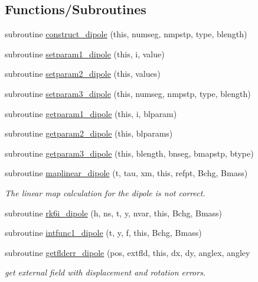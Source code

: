 \subsection*{Functions/\+Subroutines}
\begin{DoxyCompactItemize}
\item 
subroutine \mbox{\hyperlink{namespacedipoleclass_ad926e6953a9110fb9662f9d75aec0578}{construct\+\_\+dipole}} (this, numseg, nmpstp, type, blength)
\item 
subroutine \mbox{\hyperlink{namespacedipoleclass_a88c00f58bdecf1b9c087e1fa6fe4d890}{setparam1\+\_\+dipole}} (this, i, value)
\item 
subroutine \mbox{\hyperlink{namespacedipoleclass_af9b4f7bb26e407880166d1b7d19f8877}{setparam2\+\_\+dipole}} (this, values)
\item 
subroutine \mbox{\hyperlink{namespacedipoleclass_a46e12e75054e010d776e23895101e223}{setparam3\+\_\+dipole}} (this, numseg, nmpstp, type, blength)
\item 
subroutine \mbox{\hyperlink{namespacedipoleclass_af02462235721b966a71753610096e85a}{getparam1\+\_\+dipole}} (this, i, blparam)
\item 
subroutine \mbox{\hyperlink{namespacedipoleclass_af793a317f0b5d337d6818755609641a7}{getparam2\+\_\+dipole}} (this, blparams)
\item 
subroutine \mbox{\hyperlink{namespacedipoleclass_a6a7322bcea3d9d07affd0628002985fd}{getparam3\+\_\+dipole}} (this, blength, bnseg, bmapstp, btype)
\item 
subroutine \mbox{\hyperlink{namespacedipoleclass_a3388afe517788e8b824b96bf49793510}{maplinear\+\_\+dipole}} (t, tau, xm, this, refpt, Bchg, Bmass)
\begin{DoxyCompactList}\small\item\em The linear map calculation for the dipole is not correct. \end{DoxyCompactList}\item 
subroutine \mbox{\hyperlink{namespacedipoleclass_a1a92cd51d6ad864d251dd3abdc361ba8}{rk6i\+\_\+dipole}} (h, ns, t, y, nvar, this, Bchg, Bmass)
\item 
subroutine \mbox{\hyperlink{namespacedipoleclass_ab15f3a0defc0de419f5613659abc9cad}{intfunc1\+\_\+dipole}} (t, y, f, this, Bchg, Bmass)
\item 
subroutine \mbox{\hyperlink{namespacedipoleclass_a0a75204835a2e4dd1ea67c1ee32e62fe}{getflderr\+\_\+dipole}} (pos, extfld, this, dx, dy, anglex, angley
\begin{DoxyCompactList}\small\item\em get external field with displacement and rotation errors. \end{DoxyCompactList}\item 

\end{DoxyCompactItemize}
